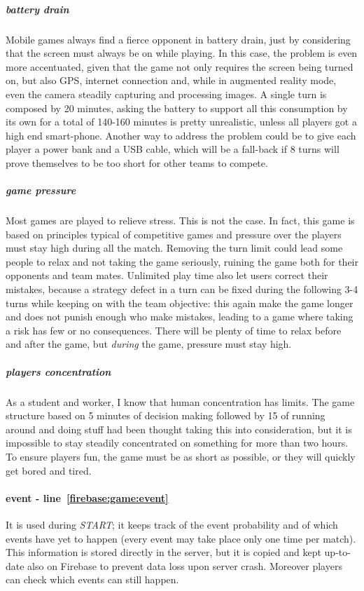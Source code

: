 				\subparagraph{battery drain}
				Mobile games always find a fierce opponent in battery drain, just by considering that the screen must always be on while playing.
				In this case, the problem is even more accentuated, given that the game not only requires the screen being turned on, but also GPS, internet connection and, while in augmented reality mode, even the camera steadily capturing and processing images.
				A single turn is composed by 20 minutes, asking the battery to support all this consumption by its own for a total of 140-160 minutes is pretty unrealistic, unless all players got a high end smart-phone.
				Another way to address the problem could be to give each player a power bank and a USB cable, which will be a fall-back if 8 turns will prove themselves to be too short for other teams to compete.
				
				\subparagraph{game pressure}
				Most games are played to relieve stress. This is not the case. In fact, this game is based on principles typical of competitive games and pressure over the players must stay high during all the match. Removing the turn limit could lead some people to relax and not taking the game seriously, ruining the game both for their opponents and team mates.
				Unlimited play time also let users correct their mistakes, because a strategy defect in a turn can be fixed during the following 3-4 turns while keeping on with the team objective: this again make the game longer and does not punish enough who make mistakes, leading to a game where taking a risk has few or no consequences.
				There will be plenty of time to relax before and after the game, but \emph{during} the game, pressure must stay high.
				
				\subparagraph{players concentration}
				As a student and worker, I know that human concentration has limits. The game structure based on 5 minutes of decision making followed by 15 of running around and doing stuff had been thought taking this into consideration, but it is impossible to stay steadily concentrated on something for more than two hours.
				To ensure players fun, the game must be as short as possible, or they will quickly get bored and tired.
				
				
				\paragraph{event - line~\ref{firebase:game:event}}
				It is used during \emph{START}; it keeps track of the event probability and of which events have yet to happen (every event may take place only one time per match). This information is stored directly in the server, but it is copied and kept up-to-date also on Firebase to prevent data loss upon server crash. Moreover players can check which events can still happen.
				
